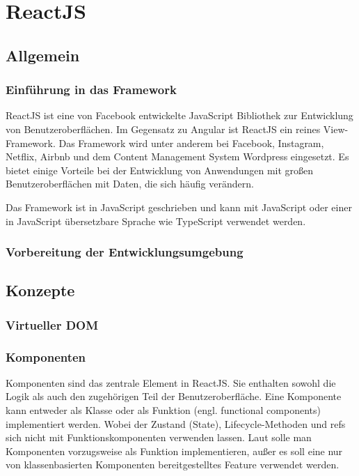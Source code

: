 \chapter{ReactJS}
\label{ch:reactJS}

\section{Allgemein}

\subsection{Einführung in das Framework}

ReactJS ist eine von Facebook entwickelte JavaScript Bibliothek zur Entwicklung von Benutzeroberflächen. Im Gegensatz zu Angular ist ReactJS ein reines View-Framework. Das Framework wird unter anderem bei Facebook, Instagram, Netflix, Airbnb und dem Content Management System Wordpress eingesetzt. Es bietet einige Vorteile bei der Entwicklung von Anwendungen mit großen Benutzeroberflächen mit Daten, die sich häufig verändern. 

Das Framework ist in JavaScript geschrieben und kann mit JavaScript oder einer in JavaScript übersetzbare Sprache wie TypeScript verwendet werden.\autocites[vgl.][1\psqq]{Gackenheimer.2015}[vgl.][3\psqq]{Zeigermann.2016}


\subsection{Vorbereitung der Entwicklungsumgebung}



\section{Konzepte}

\subsection{Virtueller DOM}


\subsection{Komponenten}
Komponenten sind das zentrale Element in ReactJS. Sie enthalten sowohl die Logik als auch den zugehörigen Teil der Benutzeroberfläche. Eine Komponente kann entweder als Klasse oder als Funktion (engl. functional components) implementiert werden. Wobei der Zustand (State), Lifecycle-Methoden und refs sich nicht  mit Funktionskomponenten verwenden lassen. Laut \textcite[vgl.][82\psq]{Zeigermann.2016} solle man Komponenten vorzugsweise als Funktion implementieren,  außer es soll eine nur von klassenbasierten Komponenten bereitgestelltes Feature verwendet werden. 

